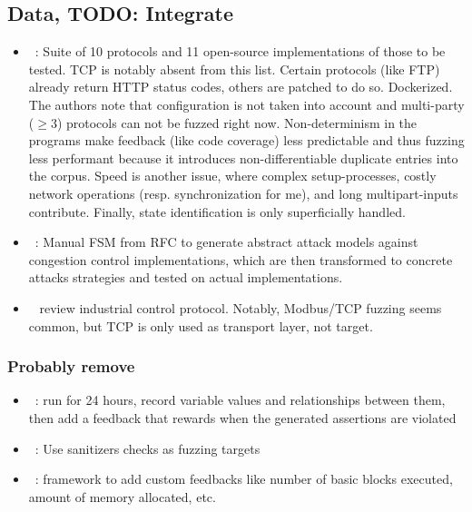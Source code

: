 \documentclass{article}
\let\savedCite=\cite
\renewcommand{\cite}{\unskip~\savedCite}
\begin{document}
\begin{multicols}{2}
  \subsection{Data, TODO: Integrate}
  \begin{itemize}
    \item {}\cite{ProFuzzBench}: Suite of 10 protocols and 11 open-source implementations of those to be tested. TCP is notably absent from this list. Certain protocols (like FTP) already return HTTP status codes, others are patched to do so. Dockerized. The authors note that configuration is not taken into account and multi-party ($\geq 3$) protocols can not be fuzzed right now. Non-determinism in the programs make feedback (like code coverage) less predictable and thus fuzzing less performant because it introduces non-differentiable duplicate entries into the corpus. Speed is another issue, where complex setup-processes, costly network operations (resp. synchronization for me), and long multipart-inputs contribute. Finally, state identification is only superficially handled.
    \item {}\cite{Congestion}: Manual FSM from RFC to generate abstract attack models against congestion control implementations, which are then transformed to concrete attacks strategies and tested on actual implementations.
    \item {}\cite{IndustrialReview} review industrial control protocol. Notably, Modbus/TCP fuzzing seems common, but TCP is only used as transport layer, not target.
  \end{itemize}

  \subsubsection{Probably remove}
  \begin{itemize}
    \item {}\cite{INVSCOV}: run for 24 hours, record variable values and relationships between them, then add a feedback that rewards when the generated assertions are violated
    \item {}\cite{ParmeSan}: Use sanitizers checks as fuzzing targets
    \item {}\cite{FuzzFactory}: framework to add custom feedbacks like number of basic blocks executed, amount of memory allocated, etc.

  \end{itemize}


\end{multicols}
\end{document}
